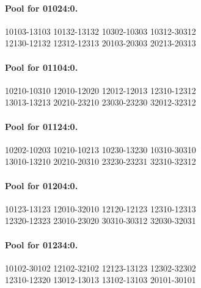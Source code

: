 \documentclass[11pt]{article}
\theoremstyle{remark}
\numberwithin{equation}{section}
\numberwithin{table}{section}
\begin{document}
\paragraph{Pool for 01024:0.}
\begingroup\footnotesize\ttfamily\begin{flushleft}
10103-13103 10132-13132 10302-10303 10312-30312\\
12130-12132 12312-12313 20103-20303 20213-20313\\
\end{flushleft}\endgroup
\paragraph{Pool for 01104:0.}
\begingroup\footnotesize\ttfamily\begin{flushleft}
10210-10310 12010-12020 12012-12013 12310-12312\\
13013-13213 20210-23210 23030-23230 32012-32312\\
\end{flushleft}\endgroup
\paragraph{Pool for 01124:0.}
\begingroup\footnotesize\ttfamily\begin{flushleft}
10202-10203 10210-10213 10230-13230 10310-30310\\
13010-13210 20210-20310 23230-23231 32310-32312\\
\end{flushleft}\endgroup
\paragraph{Pool for 01204:0.}
\begingroup\footnotesize\ttfamily\begin{flushleft}
10123-13123 12010-32010 12120-12123 12310-12313\\
12320-12323 23010-23020 30310-30312 32030-32031\\
\end{flushleft}\endgroup
\paragraph{Pool for 01234:0.}
\begingroup\footnotesize\ttfamily\begin{flushleft}
10102-30102 12102-32102 12123-13123 12302-32302\\
12310-12320 13012-13013 13102-13103 20101-30101\\
\end{flushleft}\endgroup
\end{document}
